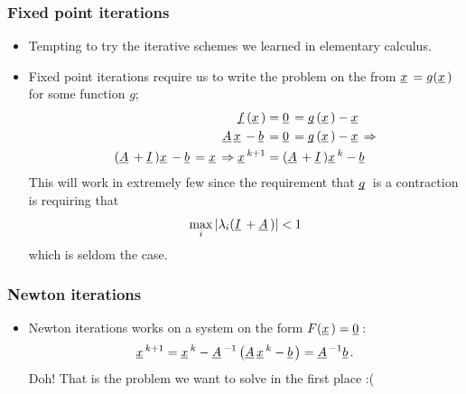 \documentclass{beamer}
\newcommand{\ub}[1]{\underbar{$#1$}\,}
\begin{document}
\begin{frame}
\frametitle{Fixed point iterations}
\begin{itemize}
  \item Tempting to try the iterative schemes we learned in elementary calculus.
  \item Fixed point iterations require us to write the problem on the from $\ub{x} = g(\ub{x})$ for some function $g$;
    \[
      \begin{split}
        \ub{f}(\ub{x}) &= \ub{0} = \ub{g}(\ub{x})-\ub{x} \\
        \ub{A}\ub{x}-\ub{b} &= \ub{0} = \ub{g}(\ub{x})-\ub{x} \Rightarrow \\
        (\ub{A}+\ub{I})\ub{x}-\ub{b} = \ub{x} \Rightarrow
        \ub{x}^{k+1} &= (\ub{A}+\ub{I})\ub{x}^k-\ub{b}
      \end{split}
    \]
    This will work in extremely few since the requirement that $\ub{g}$ is a contraction
    is requiring that
    \[
      \max_{i}|\lambda_i(\ub{I}+\ub{A})| < 1
    \]
    which is seldom the case.
  \end{itemize}
\end{frame}
\begin{frame}
\frametitle{Newton iterations}
  \begin{itemize}
    \item Newton iterations works on a system on the form $F(\ub{x}) = \ub{0}$:
      \[
        \ub{x}^{k+1} = \ub{x}^k-\ub{A}^{-1}\left(\ub{A}\ub{x}^k-\ub{b}\right) = \ub{A}^{-1}\ub{b}.
      \]
      Doh! That is the problem we want to solve in the first place :(
  \end{itemize}
\end{frame}
\end{document}
